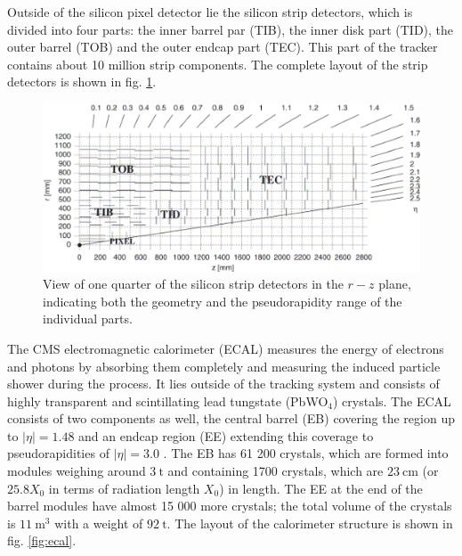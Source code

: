 Outside of the silicon pixel detector lie the silicon strip detectors, which is divided into four parts: the inner barrel par (TIB), the inner disk part (TID), the outer barrel (TOB) and the outer endcap part (TEC). This part of the tracker contains about 10 million strip components. The complete layout of the strip detectors is shown in fig. \ref{fig:strip_tracker}.

\begin{figure}[h!]
	\centering
	\includegraphics[width=0.8\linewidth]{figures/experiment/StripTracker}
	\caption{View of one quarter of the silicon strip detectors in the $r-z$ plane, indicating both the geometry and the pseudorapidity range of the individual parts. \cite{Azzurri:914891}}
	\label{fig:strip_tracker}
\end{figure}


The CMS electromagnetic calorimeter (ECAL) measures the energy of electrons and photons by absorbing them completely and measuring the induced particle shower during the process. It lies outside of the tracking system and consists of highly transparent and scintillating lead tungstate (PbWO$_4$) crystals. The ECAL consists of two components as well, the central barrel (EB) covering the region up to $|\eta| = 1.48$ and an endcap region (EE) extending this coverage to pseudorapidities of $|\eta| = 3.0$ \cite{Biino_2015}. The EB has 61 200 crystals, which are formed into modules weighing around $\SI{3}{\tonne}$ and containing 1700 crystals, which are $\SI{23}{\centi\meter}$ (or $25.8 X_0$ in terms of radiation length $X_0$) in length. The EE at the end of the barrel modules have almost 15 000 more crystals; the total volume of the crystals is $\SI{11}{\cubic\meter}$ with a weight of $\SI{92}{\tonne}$. The layout of the calorimeter structure is shown in fig. \ref{fig:ecal}.

